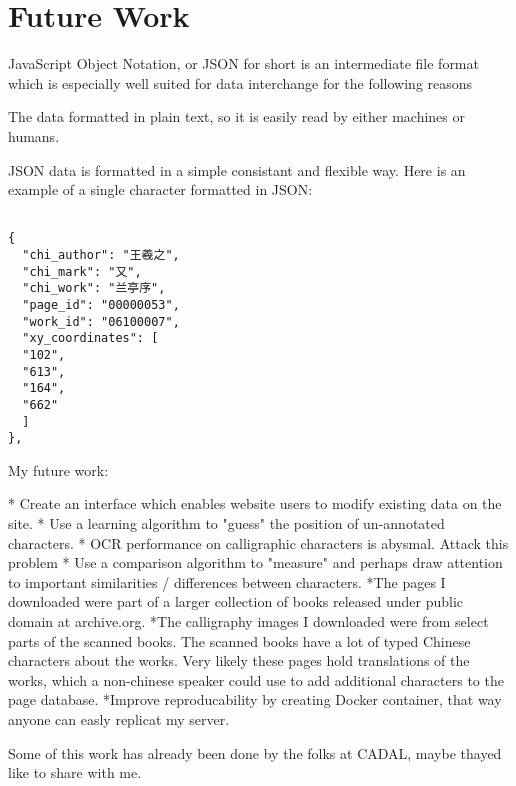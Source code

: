\chapter{Future Work}
JavaScript Object Notation, or JSON for short is an intermediate file format which is especially well suited for data interchange for the following reasons

The data formatted in plain text, so it is easily read by either machines or humans.

JSON data is formatted in a simple consistant and flexible way.  Here is an example of a single character formatted in JSON:

\begin{verbatim}
    
{
  "chi_author": "王羲之",
  "chi_mark": "又",
  "chi_work": "兰亭序",
  "page_id": "00000053",
  "work_id": "06100007",
  "xy_coordinates": [
  "102",
  "613",
  "164",
  "662"
  ]
},
\end{verbatim}


My future work:
        
        *  Create an interface which enables website users to modify existing data on the site.
        *  Use a learning algorithm to "guess" the position of un-annotated characters.
        *  OCR performance on calligraphic characters is abysmal.  Attack this problem
        *  Use a comparison algorithm to "measure" and perhaps draw attention to important similarities / differences between characters.
        *The pages I downloaded were part of a larger collection of books released under public domain at archive.org.
        *The calligraphy images I downloaded were from select parts of the scanned books.  The scanned books have a lot of typed Chinese characters about the works.  Very likely these pages hold translations of the works, which a non-chinese speaker could use to add additional characters to the page database.
        *Improve reproducability by creating Docker container, that way anyone can easly replicat my server.

    Some of this work has already been done by the folks at CADAL, maybe thayed like to share with me.
